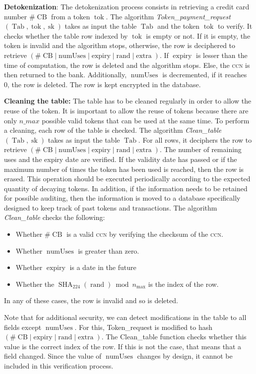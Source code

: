 \documentclass{llncs}
\DeclareMathOperator{\numUses}{numUses}
\DeclareMathOperator{\Tab}{Tab}
\DeclareMathOperator{\CB}{CB}
\DeclareMathOperator{\expiry}{expiry}
\DeclareMathOperator{\extra}{extra}
\DeclareMathOperator{\rand}{rand}
\DeclareMathOperator{\sk}{sk}
\DeclareMathOperator{\SHA}{SHA}
\DeclareMathOperator{\tok}{tok}
\begin{document}
\textbf{Detokenization}: The detokenization process consists in retrieving a credit card number $\#\CB$ from a token $\tok$. The algorithm \textit{Token\_payment\_request}$(\Tab, \tok, \sk)$ takes as input the table $\Tab$ and the token $\tok$ to verify. It checks whether the table row indexed by $\tok$ is empty or not. If it is empty, the token is invalid and the algorithm stops, otherwise, the row is deciphered to retrieve $(\#\CB | \numUses | \expiry | \rand | \extra)$. If $\expiry$ is lesser than the time of computation, the row is deleted and the algorithm stops. Else, the \textsc{ccn} is then returned to the bank. Additionally, $\numUses$ is decremented, if it reaches 0, the row is deleted. The row is kept encrypted in the database.

\textbf{Cleaning the table:} The table has to be cleaned regularly in order to allow the reuse of the token. It is important to allow the reuse of tokens because there are only $n\_{max}$ possible valid tokens that can be used at the same time. To perform a cleaning, each row of the table is checked. The algorithm \textit{Clean\_table}$(\Tab,\sk)$ takes as input the table $\Tab$. For all rows, it deciphers the row to retrieve $(\#\CB | \numUses | \expiry | \rand | \extra)$. The number of remaining uses and the expiry date are verified. If the validity date has passed or if the maximum number of times the token has been used is reached, then the row is erased. This operation should be executed periodically according to the expected quantity of decaying tokens. In addition, if the information needs to be retained for possible auditing, then the information is moved to a database specifically designed to keep track of past tokens and transactions. The algorithm \textit{Clean\_table} checks the following:
\begin{itemize}
    \item Whether $\#\CB$ is a valid \textsc{ccn} by verifying the checksum of the \textsc{ccn}.
    \item Whether $\numUses$ is greater than zero.
    \item Whether $\expiry$ is a date in the future
    \item Whether the $\SHA_{224}(\rand)\bmod n_{\max}$ is the index of the row.
\end{itemize}
In any of these cases, the row is invalid and so is deleted.

Note that for additional security, we can detect modifications in the table to all fields except $\numUses$. For this, Token\_request is modified to hash $(\#\CB | \expiry | \rand | \extra)$. The Clean\_table function checks whether this value is the correct index of the row. If this is not the case, that means that a field changed. Since the value of $\numUses$ changes by design, it cannot be included in this verification process.
\end{document}

